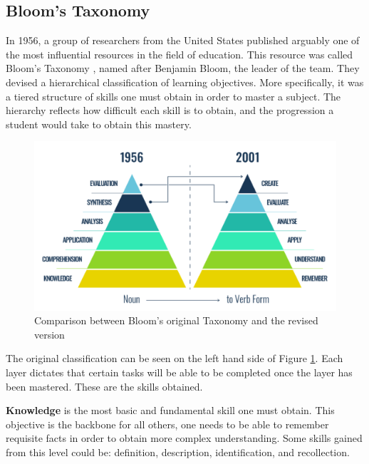 \subsection{Bloom's Taxonomy} \label{subsection:blooms}


In 1956, a group of researchers from the United States published arguably one of the most influential resources in the field of education. This resource was called Bloom's Taxonomy \cite{bloom-handbook-i}, named after Benjamin Bloom, the leader of the team. They devised a hierarchical classification of learning objectives. More specifically, it was a tiered structure of skills one must obtain in order to master a subject. The hierarchy reflects how difficult each skill is to obtain, and the progression a student would take to obtain this mastery.

\begin{figure}[h]
\centering
\includegraphics[scale=0.575]{./images/misc/blooms}
\caption{Comparison between Bloom's original Taxonomy and the revised version \cite{bloom-picture}} \label{fig:blooms}
\end{figure}

The original classification can be seen on the left hand side of Figure \ref{fig:blooms}. Each layer dictates that certain tasks will be able to be completed once the layer has been mastered. These are the skills obtained.

\textbf{Knowledge} is the most basic and fundamental skill one must obtain. This objective is the backbone for all others, one needs to be able to remember requisite facts in order to obtain more complex understanding. Some skills gained from this level could be: definition, description, identification, and recollection.

